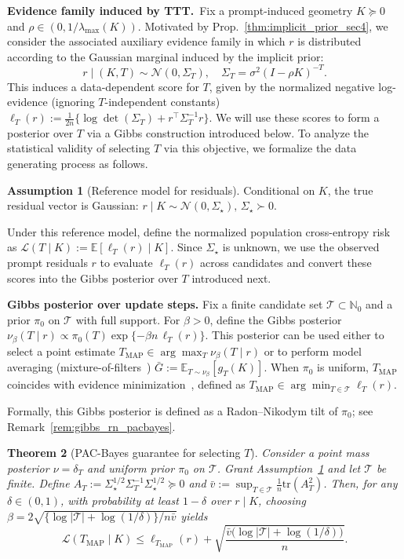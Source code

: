 \documentclass{article}
\theoremstyle{plain}
\newtheorem{theorem}{Theorem}[section]
\theoremstyle{definition}
\newtheorem{assumption}[theorem]{Assumption}
\theoremstyle{remark}
\begin{document}
\textbf{Evidence family induced by TTT.}\,
Fix a prompt-induced geometry $K\succeq 0$ and $\rho\in(0,1/\lambda_{\max}(K))$. Motivated by Prop.~\ref{thm:implicit_prior_sec4}, we consider the associated auxiliary evidence family in which $r$ is distributed according to the Gaussian marginal induced by the implicit prior: 
\[
    r\mid (K,T)\sim\mathcal N(0,\Sigma_T),\quad \Sigma_T=\sigma^2(I-\rho K)^{-T}.
\]
This induces a data-dependent score for $T$, given by the normalized negative log-evidence (ignoring $T$-independent constants) $\ell_T(r):= \frac{1}{2n}\big\{\log\det\nolimits(\Sigma_T) + r^\top \Sigma_T^{-1} r\big\}$. We will use these scores to form a posterior over $T$ via a Gibbs construction introduced below.
To analyze the statistical validity of selecting $T$ via this objective, we formalize the data generating process as follows.
\begin{assumption}[Reference model for residuals]\label{eq:ref_model_pac}
Conditional on $K$, the true residual vector is Gaussian: $r \mid K \sim \mathcal N(0,\Sigma_\star),\, \Sigma_\star \succ 0.$
\end{assumption}
Under this reference model, define the normalized population cross-entropy risk as $\mathcal L(T\mid K):=\mathbb E[\ell_T(r)\mid K]$. Since $\Sigma_\star$ is unknown, we use the observed prompt residuals $r$ to evaluate $\ell_T(r)$ across candidates and convert these scores into the Gibbs posterior over $T$ introduced next.

\textbf{Gibbs posterior over update steps.}
Fix a finite candidate set $\mathcal T\subset\mathbb N_0$ and a prior $\pi_0$ on $\mathcal T$ with full support. For $\beta>0$, define the Gibbs posterior $\nu_\beta(T\mid r)\propto\pi_0(T)\exp\{-\beta n\,\ell_T(r)\}$. This posterior can be used either to select a point estimate $T_{\mathrm{MAP}}\in\arg\max_T \nu_\beta(T\mid r)$ or to perform model averaging (mixture-of-filters~\citep{DalalyanTsybakov2008ExponentialWeighting}) $\bar G:=\mathbb E_{T\sim\nu_\beta}[g_T(K)]$. When $\pi_0$ is uniform, $T_{\mathrm{MAP}}$ coincides with evidence minimization~\citep{NIPS2016_84d2004b}, defined as $T_{\mathrm{MAP}}\in\arg\min_{T\in\mathcal T}\ell_T(r)$.

Formally, this Gibbs posterior is defined as a Radon--Nikodym tilt of $\pi_0$; see Remark~\ref{rem:gibbs_rn_pacbayes}.

\begin{theorem}[PAC-Bayes guarantee for 
selecting $T$]\label{thm:pac_bayes_horizon_main}
Consider a point mass posterior $\nu=\delta_T$ and uniform prior $\pi_0$ on $\mathcal{T}$. Grant Assumption~\ref{eq:ref_model_pac} and let $\mathcal T$ be finite. Define $A_T:=\Sigma_\star^{1/2}\Sigma_T^{-1}\Sigma_\star^{1/2}\succeq 0$ and $\bar v:=\sup_{T\in\mathcal T} \frac{1}{n}\mathrm{tr}(A_T^2)$. Then, for any $\delta\in(0,1)$, with probability at least $1-\delta$ over $r\mid K$, choosing $\beta = 2\sqrt{\{\log|\mathcal T|+\log(1/\delta)\}/n\bar v}$ yields
\begin{equation}
    \mathcal L(T_{\mathrm{MAP}}\mid K)  \le  \ell_{T_{\mathrm{MAP}}}(r) + \sqrt{\frac{\bar v\bigl(\log|\mathcal T|+\log(1/\delta)\bigr)}{n}} .
\label{eq:pac_bound_main}
\end{equation}
\end{theorem}
\end{document}
